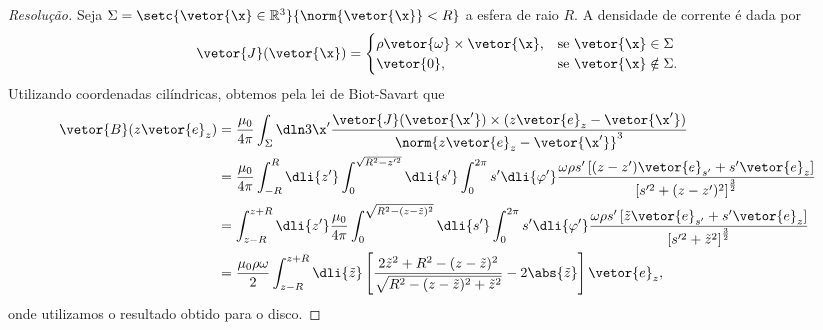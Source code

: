 \begin{proof}[Resolução]
    Seja \(\Sigma = \setc{\vetor{\x}\in \mathbb{R}^3}{\norm{\vetor{\x}} < R}\) a esfera de raio \(R\). A densidade de corrente é dada por
    \begin{equation*}
        \vetor{J}(\vetor{\x}) = \begin{cases}
            \rho \vetor{\omega}\times \vetor{\x},&\text{se }\vetor{\x}\in \Sigma\\
            \vetor{0},&\text{se }\vetor{\x}\notin \Sigma.
        \end{cases}
    \end{equation*}
    Utilizando coordenadas cilíndricas, obtemos pela lei de Biot-Savart que
    \begin{align*}
        \vetor{B}(z \vetor{e}_z)
        &= \frac{\mu_0}{4\pi} \int_{\Sigma} \dln3{\x'} \frac{\vetor{J}(\vetor{\x'}) \times (z\vetor{e}_z - \vetor{\x'})}{\norm{z\vetor{e}_z - \vetor{\x'}}^3}\\
        &= \frac{\mu_0}{4\pi} \int_{-R}^{R}\dli{z'} \int_{0}^{\sqrt{R^2 - z'^2}}\dli{s'} \int_0^{2\pi}s'\dli{\varphi'} \frac{\omega \rho s'\left[(z - z')\vetor{e}_{s'} + s'\vetor{e}_z\right]}{\left[s'^2 + (z - z')^2\right]^{\frac32}}\\
        &=  \int_{z-R}^{z+R}\dli{z'} \frac{\mu_0}{4\pi}\int_{0}^{\sqrt{R^2 - (z - \tilde{z})^2}}\dli{s'} \int_0^{2\pi}s'\dli{\varphi'} \frac{\omega \rho s'\left[\tilde{z}\vetor{e}_{s'} + s'\vetor{e}_z\right]}{\left[s'^2 + \tilde{z}^2\right]^{\frac32}}\\
        &= \frac{\mu_0 \rho\omega}{2}\int_{z - R}^{z + R} \dli{\tilde{z}} \left[\frac{2\tilde{z}^2 + R^2 - (z - \tilde{z})^2}{\sqrt{R^2 - (z - \tilde{z})^2 + \tilde{z}^2}} - 2\abs{\tilde{z}}\right]\vetor{e}_z,
    \end{align*}
    onde utilizamos o resultado obtido para o disco.
\end{proof}
